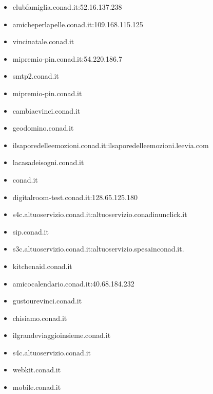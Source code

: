 \documentclass{article}
\begin{document}
\begin{itemize}
        \item clubfamiglia.conad.it:52.16.137.238
    
        \item amicheperlapelle.conad.it:109.168.115.125
    
        \item vincinatale.conad.it
    
        \item mipremio-pin.conad.it:54.220.186.7
    
        \item smtp2.conad.it
    
        \item mipremio-pin.conad.it
    
        \item cambiaevinci.conad.it
    
        \item geodomino.conad.it
    
        \item ilsaporedelleemozioni.conad.it:ilsaporedelleemozioni.leevia.com
    
        \item lacasadeisogni.conad.it
    
        \item conad.it
    
        \item digitalroom-test.conad.it:128.65.125.180
    
        \item s4c.altuoservizio.conad.it:altuoservizio.conadinunclick.it
    
        \item sip.conad.it
    
        \item s3c.altuoservizio.conad.it:altuoservizio.spesainconad.it.
    
        \item kitchenaid.conad.it
    
        \item amicocalendario.conad.it:40.68.184.232
    
        \item gustourevinci.conad.it
    
        \item chisiamo.conad.it
    
        \item ilgrandeviaggioinsieme.conad.it
    
        \item s4c.altuoservizio.conad.it
    
        \item webkit.conad.it
    
        \item mobile.conad.it
    
\end{itemize}
\normalsize
\end{document}
